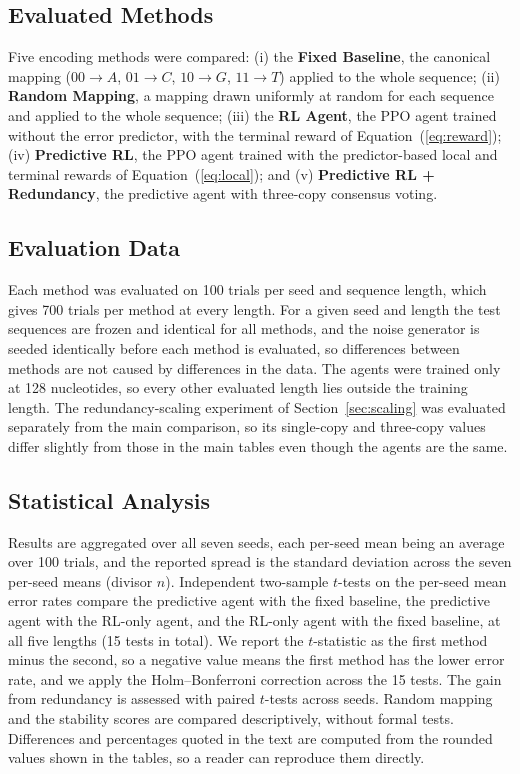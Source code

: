 \documentclass[entropy,article,submit,moreauthors]{Definitions/mdpi}
\begin{document}
\subsection{Evaluated Methods}

Five encoding methods were compared:
(i) the \textbf{Fixed Baseline}, the canonical mapping ($00 \to A$, $01 \to C$, $10 \to G$, $11 \to T$) applied to the whole sequence;
(ii) \textbf{Random Mapping}, a mapping drawn uniformly at random for each sequence and applied to the whole sequence;
(iii) the \textbf{RL Agent}, the PPO agent trained without the error predictor, with the terminal reward of Equation~(\ref{eq:reward});
(iv) \textbf{Predictive RL}, the PPO agent trained with the predictor-based local and terminal rewards of Equation~(\ref{eq:local}); and
(v) \textbf{Predictive RL + Redundancy}, the predictive agent with three-copy consensus voting.

\subsection{Evaluation Data}

Each method was evaluated on 100 trials per seed and sequence length, which gives 700 trials per method at every length. For a given seed and length the test sequences are frozen and identical for all methods, and the noise generator is seeded identically before each method is evaluated, so differences between methods are not caused by differences in the data. The agents were trained only at 128 nucleotides, so every other evaluated length lies outside the training length. The redundancy-scaling experiment of Section~\ref{sec:scaling} was evaluated separately from the main comparison, so its single-copy and three-copy values differ slightly from those in the main tables even though the agents are the same.

\subsection{Statistical Analysis}

Results are aggregated over all seven seeds, each per-seed mean being an average over 100 trials, and the reported spread is the standard deviation across the seven per-seed means (divisor $n$). Independent two-sample $t$-tests on the per-seed mean error rates compare the predictive agent with the fixed baseline, the predictive agent with the RL-only agent, and the RL-only agent with the fixed baseline, at all five lengths (15 tests in total). We report the $t$-statistic as the first method minus the second, so a negative value means the first method has the lower error rate, and we apply the Holm--Bonferroni correction across the 15 tests. The gain from redundancy is assessed with paired $t$-tests across seeds. Random mapping and the stability scores are compared descriptively, without formal tests. Differences and percentages quoted in the text are computed from the rounded values shown in the tables, so a reader can reproduce them directly.
\end{document}
